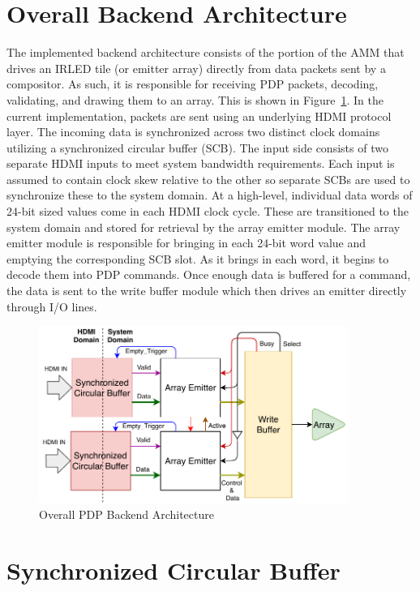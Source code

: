 \section{Overall Backend Architecture}
    \label{sec:backend_arch}
    The implemented backend architecture consists of the portion of the AMM that drives an IRLED tile (or emitter array) directly from data packets sent by a compositor. As such, it is responsible for receiving PDP packets, decoding, validating, and drawing them to an array. This is shown in Figure~\ref{fig:overall_arch}. In the current implementation, packets are sent using an underlying HDMI protocol layer. The incoming data is synchronized across two distinct clock domains utilizing a synchronized circular buffer (SCB). The input side consists of two separate HDMI inputs to meet system bandwidth requirements. Each input is assumed to contain clock skew relative to the other so separate SCBs are used to synchronize these to the system domain. At a high-level, individual data words of 24-bit sized values come in each HDMI clock cycle. These are transitioned to the system domain and stored for retrieval by the array emitter module. The array emitter module is responsible for bringing in each 24-bit word value and emptying the corresponding SCB slot. As it brings in each word, it begins to decode them into PDP commands. Once enough data is buffered for a command, the data is sent to the write buffer module which then drives an emitter directly through I/O lines.

    \begin{figure}
        \centering
        \includegraphics[width=0.9\textwidth]{fig/pdp_overall_arch.pdf}
        \caption{Overall PDP Backend Architecture}
        \label{fig:overall_arch}
    \end{figure}

\section{Synchronized Circular Buffer}

